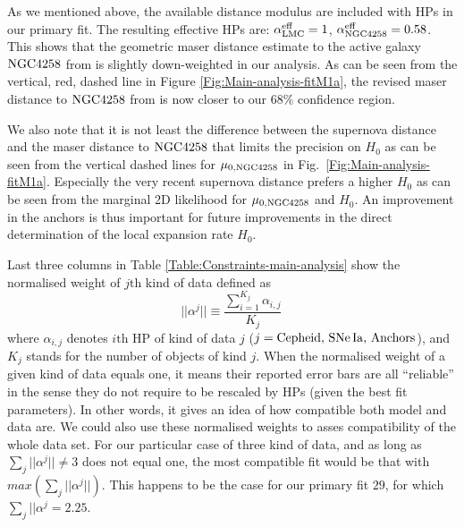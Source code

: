 As we mentioned above, the available distance modulus are included with HPs in our primary fit. The resulting effective HPs are: $\alpha^{\mathrm{eff}}_{\mathrm{LMC}}=1$, $\alpha^{\mathrm{eff}}_{\mathrm{NGC4258}}=0.58$. This shows that the geometric maser distance estimate to the active galaxy $\mathrm{NGC4258}$ from \cite{Humphreys:2013eja} is slightly down-weighted in our analysis.  As can be seen from the vertical, red, dashed line in Figure \ref{Fig:Main-analysis-fitM1a}, the revised maser distance to $\mathrm{NGC4258}$  from \cite{Riess:2016jrr} is now closer to our $68\%$ confidence region.     

We also note that it is not least the difference between the supernova distance \cite{Polshaw:2015ika} and
the maser distance \cite{Humphreys:2013eja} to $\mathrm{NGC4258}$ that limits the precision on $H_0$ as can be seen from the vertical dashed lines
for $\mu_{0,\mathrm{NGC4258}}$ in Fig.\ \ref{Fig:Main-analysis-fitM1a}. Especially the very recent supernova distance prefers a higher $H_0$ as can be seen
from the marginal 2D likelihood for $\mu_{0,\mathrm{NGC4258}}$ and $H_0$. An improvement in the anchors is thus important for future improvements in the
direct determination of the local expansion rate $H_0$. %

Last three columns in Table \ref{Table:Constraints-main-analysis} show the normalised weight of $j\mathrm{th}$ kind of data  defined as 
\begin{equation}
|| \alpha^{j} || \equiv \frac{\sum_{i=1}^{K_j} \alpha_{i,j}}{K_j}\,
\end{equation} 
where $\alpha_{i,j}$ denotes $i\mathrm{th}$ HP of kind of data $j$ ($j=\mathrm{Cepheid},\,\mathrm{SNe\,Ia},\,\mathrm{Anchors}$), and $K_j$ stands for the number of objects of kind $j$. When the normalised weight of a given kind of data equals one, it means their reported error bars are all ``reliable'' in the sense they do not require to be rescaled by HPs (given the best fit parameters). In other words, it gives an idea of how compatible both model and data are. We could also use these normalised weights to asses compatibility of the whole data set. For our particular case of three kind of data, and as long as $\sum_j|| \alpha^{j} ||\neq 3$ does not equal one, the most compatible fit would be that with $max(\sum_j|| \alpha^{j} ||)$. This happens to be the case for our primary fit $29$, for which  $\sum_j|| \alpha^{j}=2.25$. 


